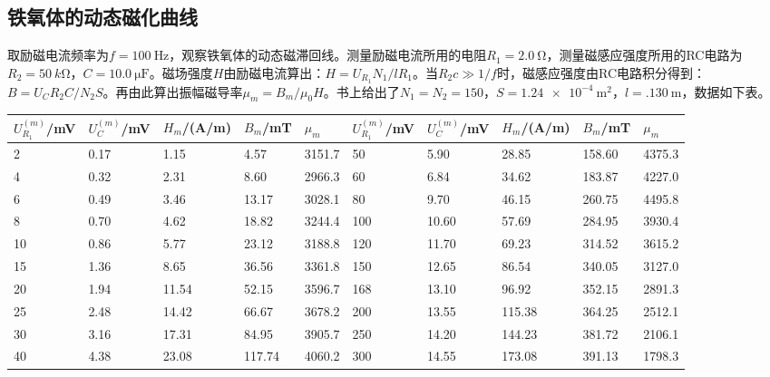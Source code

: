 \documentclass[UTF8]{ctexart}
\begin{document}
\subsection{铁氧体的动态磁化曲线}
取励磁电流频率为$f=\SI{100}{\Hz}$，观察铁氧体的动态磁滞回线。测量励磁电流所用的电阻$R_1=\SI{2.0}{\ohm}$，测量磁感应强度所用的RC电路为$R_2=\SI{50}{k\ohm}$，$C=\SI{10.0}{\micro\F}$。磁场强度$H$由励磁电流算出：$H=U_{R_1}N_1/lR_1$。当$R_2c\gg1/f$时，磁感应强度由RC电路积分得到：$B=U_CR_2C/N_2S$。再由此算出振幅磁导率$\mu_m=B_m/\mu_0H$。书上给出了$N_1=N_2=150$，$S=\SI{1.24e-4}{\m\squared}$，$l=\SI{.130}{\meter}$，数据如下表。
\begin{center}
\begin{tabu}{X[c,-10]X[c,-10]X[c,-10]X[c,-10]X[c,-10]||X[c,-10]X[c,-10]X[c,-10]X[c,-10]X[c,-10]}
\hline
$U_{R_1}^{(m)}$/mV	&$U_C^{(m)}$/mV	&$H_m$/(A/m)	&$B_m$/mT	&$\mu_m$	&$U_{R_1}^{(m)}$/mV	&$U_C^{(m)}$/mV	&$H_m$/(A/m)	&$B_m$/mT	&$\mu_m$
\\
	&0.17 	&1.15 	&4.57 	&3151.7 	&50	&5.90 	&28.85 	&158.60 	&4375.3
\\
4	&0.32 	&2.31 	&8.60 	&2966.3 	&60	&6.84 	&34.62 	&183.87 	&4227.0
\\
6	&0.49 	&3.46 	&13.17 	&3028.1 	&80	&9.70 	&46.15 	&260.75 	&4495.8
\\
8	&0.70 	&4.62 	&18.82 	&3244.4 	&100	&10.60 	&57.69 	&284.95 	&3930.4
\\
10	&0.86 	&5.77 	&23.12 	&3188.8 	&120	&11.70 	&69.23 	&314.52 	&3615.2
\\
15	&1.36 	&8.65 	&36.56 	&3361.8 	&150	&12.65 	&86.54 	&340.05 	&3127.0
\\
20	&1.94 	&11.54 	&52.15 	&3596.7 	&168	&13.10 	&96.92 	&352.15 	&2891.3
\\
25	&2.48 	&14.42 	&66.67 	&3678.2 	&200	&13.55 	&115.38 	&364.25 	&2512.1
\\
30	&3.16 	&17.31 	&84.95 	&3905.7 	&250	&14.20 	&144.23 	&381.72 	&2106.1
\\
40	&4.38 	&23.08 	&117.74 	&4060.2 	&300	&14.55 	&173.08 	&391.13 	&1798.3
\\
\hline
\end{tabu}
\end{center}
\end{document}
